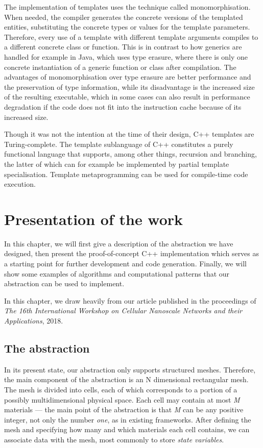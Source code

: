 \documentclass[fontsize=11pt, appendixprefix=true]{scrreprt}
\begin{document}
The implementation of templates uses the technique called monomorphisation. When
needed, the compiler generates the concrete versions of the templated entities,
substituting the concrete types or values for the template
parameters. Therefore, every use of a template with different template arguments
compiles to a different concrete class or function. This is in contrast to how
generics are handled for example in Java, which uses type erasure, where there
is only one concrete instantiation of a generic function or class after
compilation. The advantages of monomorphisation over type erasure are better
performance and the preservation of type information, while its disadvantage is
the increased size of the resulting executable, which in some cases can also
result in performance degradation if the code does not fit into the instruction
cache because of its increased size.

Though it was not the intention at the time of their design, C++ templates are
Turing-complete. The template sublanguage of C++ constitutes a purely functional
language that supports, among other things, recursion and branching, the latter
of which can for example be implemented by partial template specialisation.
Template metaprogramming can be used for compile-time code execution.

\chapter{Presentation of the work}

In this chapter, we will first give a description of the abstraction we have
designed, then present the proof-of-concept C++ implementation which serves as a
starting point for further development and code generation. Finally, we will
show some examples of algorithms and computational patterns that our abstraction
can be used to implement.

In this chapter, we draw heavily from our article published in the proceedings
of \textit{The 16th International Workshop on Cellular Nanoscale Networks and
  their Applications}, 2018\cite{MM}.

\section{The abstraction}

In its present state, our abstraction only supports structured meshes.
Therefore, the main component of the abstraction is an N dimensional rectangular
mesh.  The mesh is divided into cells, each of which corresponds to a portion of
a possibly multidimensional physical space. Each cell may contain at most
\textit{M} materials --- the main point of the abstraction is that \textit{M}
can be any positive integer, not only the number \textit{one}, as in existing
frameworks. After defining the mesh and specifying how many and which materials
each cell contains, we can associate data with the mesh, most commonly to store
\textit{state variables}.
\end{document}
